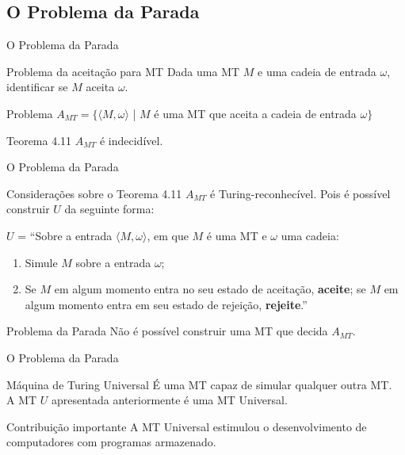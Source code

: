 \documentclass[xcolor=dvipsnames,table]{beamer}
\begin{document}
	\subsection{O Problema da Parada}
	\begin{frame}{O Problema da Parada}
		\begin{block}{Problema da aceitação para MT}
			Dada uma MT $M$ e uma cadeia de entrada $\omega$, identificar se $M$ aceita $\omega$.
		\end{block}	\pause
		\begin{block}{Problema}
			$A_{MT} = \{ \langle M, \omega \rangle$  | $M$ é uma MT que aceita a cadeia de entrada $\omega \}$
		\end{block} \pause
		\begin{alertblock}{Teorema 4.11}
			$A_{MT}$ é indecidível.
		\end{alertblock}
	\end{frame}
	
	\begin{frame}{O Problema da Parada}
		\begin{block}{Considerações sobre o Teorema 4.11}
			$A_{MT}$ é Turing-reconhecível. Pois é possível construir $U$ da seguinte forma: \pause
			
			$U$ = ``Sobre a entrada $\langle M, \omega \rangle$, em que $M$ é uma MT e $\omega$ uma cadeia:
			\begin{enumerate}
				\item Simule $M$ sobre a entrada $\omega$;
				\item Se $M$ em algum momento entra no seu estado de aceitação, {\bf aceite}; se $M$ em algum momento entra em seu estado de rejeição, {\bf rejeite}.''
			\end{enumerate}
		\end{block}	\pause
		\begin{alertblock}{Problema da Parada}
			Não é possível construir uma MT que decida $A_{MT}$.
		\end{alertblock} 
	\end{frame}
	
	\begin{frame}{O Problema da Parada}
		\begin{block}{Máquina de Turing Universal}
			É uma MT capaz de simular qualquer outra MT. \\A MT $U$ apresentada anteriormente é uma MT Universal.
		\end{block} \pause
		\begin{exampleblock}{Contribuição importante}
			A MT Universal estimulou o desenvolvimento de computadores com programas armazenado.
		\end{exampleblock} 
	\end{frame}
	
\end{document}
